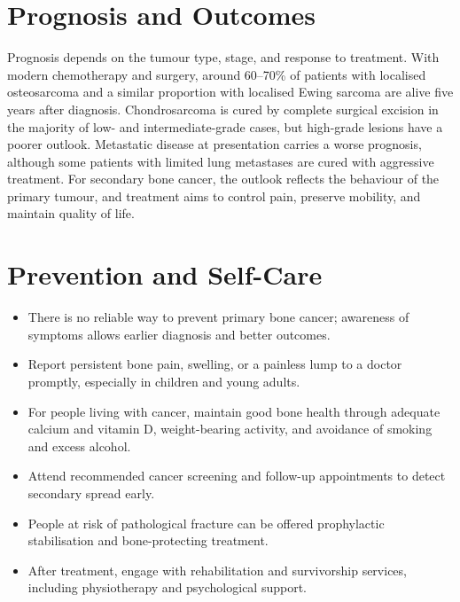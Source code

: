 \section*{Prognosis and Outcomes}
Prognosis depends on the tumour type, stage, and response to treatment. With modern chemotherapy and surgery, around 60--70\% of patients with localised osteosarcoma and a similar proportion with localised Ewing sarcoma are alive five years after diagnosis. Chondrosarcoma is cured by complete surgical excision in the majority of low- and intermediate-grade cases, but high-grade lesions have a poorer outlook. Metastatic disease at presentation carries a worse prognosis, although some patients with limited lung metastases are cured with aggressive treatment. For secondary bone cancer, the outlook reflects the behaviour of the primary tumour, and treatment aims to control pain, preserve mobility, and maintain quality of life.

\section*{Prevention and Self-Care}
\begin{itemize}
    \item There is no reliable way to prevent primary bone cancer; awareness of symptoms allows earlier diagnosis and better outcomes.
    \item Report persistent bone pain, swelling, or a painless lump to a doctor promptly, especially in children and young adults.
    \item For people living with cancer, maintain good bone health through adequate calcium and vitamin D, weight-bearing activity, and avoidance of smoking and excess alcohol.
    \item Attend recommended cancer screening and follow-up appointments to detect secondary spread early.
    \item People at risk of pathological fracture can be offered prophylactic stabilisation and bone-protecting treatment.
    \item After treatment, engage with rehabilitation and survivorship services, including physiotherapy and psychological support.
\end{itemize}

